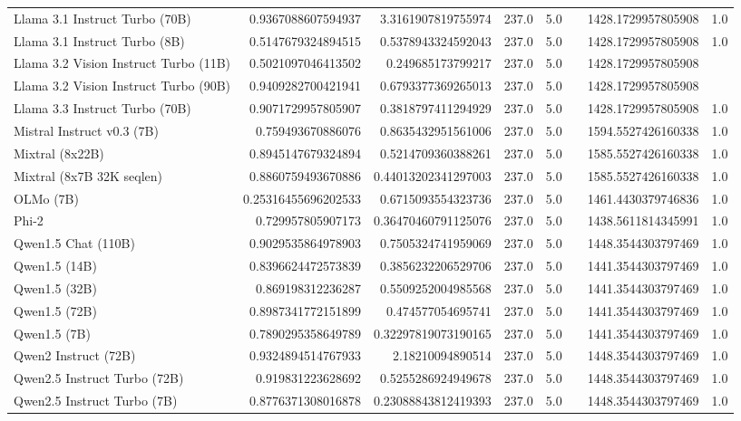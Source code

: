 \begin{table}[htp]
{\begin{tabular}{lrrrrrrr}
Llama 3.1 Instruct Turbo (70B) & 0.9367088607594937 & 3.3161907819755974 & 237.0 & 5.0 &  & 1428.1729957805908 & 1.0 \\
Llama 3.1 Instruct Turbo (8B) & 0.5147679324894515 & 0.5378943324592043 & 237.0 & 5.0 &  & 1428.1729957805908 & 1.0 \\
Llama 3.2 Vision Instruct Turbo (11B) & 0.5021097046413502 & 0.249685173799217 & 237.0 & 5.0 &  & 1428.1729957805908 &  \\
Llama 3.2 Vision Instruct Turbo (90B) & 0.9409282700421941 & 0.6793377369265013 & 237.0 & 5.0 &  & 1428.1729957805908 &  \\
Llama 3.3 Instruct Turbo (70B) & 0.9071729957805907 & 0.3818797411294929 & 237.0 & 5.0 &  & 1428.1729957805908 & 1.0 \\
Mistral Instruct v0.3 (7B) & 0.759493670886076 & 0.8635432951561006 & 237.0 & 5.0 &  & 1594.5527426160338 & 1.0 \\
Mixtral (8x22B) & 0.8945147679324894 & 0.5214709360388261 & 237.0 & 5.0 &  & 1585.5527426160338 & 1.0 \\
Mixtral (8x7B 32K seqlen) & 0.8860759493670886 & 0.44013202341297003 & 237.0 & 5.0 &  & 1585.5527426160338 & 1.0 \\
OLMo (7B) & 0.25316455696202533 & 0.6715093554323736 & 237.0 & 5.0 &  & 1461.4430379746836 & 1.0 \\
Phi-2 & 0.729957805907173 & 0.36470460791125076 & 237.0 & 5.0 &  & 1438.5611814345991 & 1.0 \\
Qwen1.5 Chat (110B) & 0.9029535864978903 & 0.7505324741959069 & 237.0 & 5.0 &  & 1448.3544303797469 & 1.0 \\
Qwen1.5 (14B) & 0.8396624472573839 & 0.3856232206529706 & 237.0 & 5.0 &  & 1441.3544303797469 & 1.0 \\
Qwen1.5 (32B) & 0.869198312236287 & 0.5509252004985568 & 237.0 & 5.0 &  & 1441.3544303797469 & 1.0 \\
Qwen1.5 (72B) & 0.8987341772151899 & 0.474577054695741 & 237.0 & 5.0 &  & 1441.3544303797469 & 1.0 \\
Qwen1.5 (7B) & 0.7890295358649789 & 0.32297819073190165 & 237.0 & 5.0 &  & 1441.3544303797469 & 1.0 \\
Qwen2 Instruct (72B) & 0.9324894514767933 & 2.18210094890514 & 237.0 & 5.0 &  & 1448.3544303797469 & 1.0 \\
Qwen2.5 Instruct Turbo (72B) & 0.919831223628692 & 0.5255286924949678 & 237.0 & 5.0 &  & 1448.3544303797469 & 1.0 \\
Qwen2.5 Instruct Turbo (7B) & 0.8776371308016878 & 0.23088843812419393 & 237.0 & 5.0 &  & 1448.3544303797469 & 1.0 \\

\end{tabular}}
\end{table}
